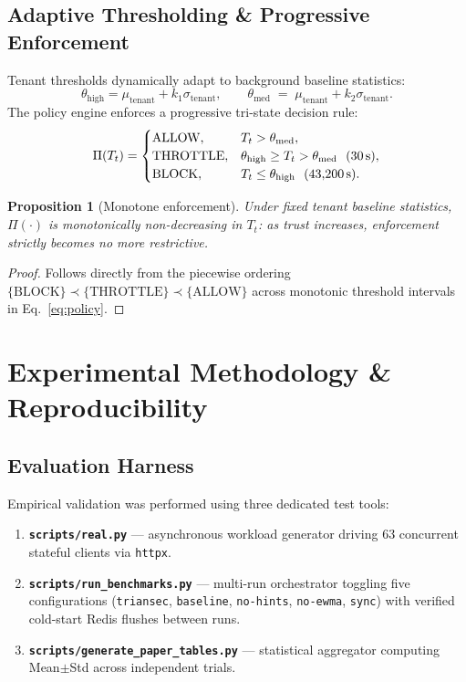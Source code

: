 \documentclass[journal,10pt]{IEEEtran}
\newtheorem{proposition}{Proposition}
\newcommand{\trust}{T_t}
\begin{document}
\subsection{Adaptive Thresholding \& Progressive Enforcement}
Tenant thresholds dynamically adapt to background baseline statistics:
\begin{equation}
\theta_{\mathrm{high}} = \mu_{\mathrm{tenant}} + k_1\sigma_{\mathrm{tenant}},\qquad
\theta_{\mathrm{med}} \;=\; \mu_{\mathrm{tenant}} + k_2\sigma_{\mathrm{tenant}}.
\end{equation}
The policy engine enforces a progressive tri-state decision rule:
\begin{equation}
\Pi(\trust)=
\begin{cases}
\mathrm{ALLOW},     & \trust > \theta_{\mathrm{med}},\\
\mathrm{THROTTLE},  & \theta_{\mathrm{high}} \ge \trust > \theta_{\mathrm{med}}\ \ (\text{30\,s}),\\
\mathrm{BLOCK},     & \trust \le \theta_{\mathrm{high}}\ \ (\text{43{,}200\,s}).
\end{cases}
\label{eq:policy}
\end{equation}

\begin{proposition}[Monotone enforcement]
Under fixed tenant baseline statistics, $\Pi(\cdot)$ is monotonically non-decreasing in $\trust$: as trust increases, enforcement strictly becomes no more restrictive.
\end{proposition}
\begin{proof}
Follows directly from the piecewise ordering $\{\mathrm{BLOCK}\}\prec\{\mathrm{THROTTLE}\}\prec\{\mathrm{ALLOW}\}$ across monotonic threshold intervals in Eq.~\eqref{eq:policy}.
\end{proof}

\section{Experimental Methodology \& Reproducibility}
\label{sec:method}

\subsection{Evaluation Harness}
Empirical validation was performed using three dedicated test tools:
\begin{enumerate}
    \item \textbf{\texttt{scripts/real.py}} --- asynchronous workload generator driving 63 concurrent stateful clients via \texttt{httpx}.
    \item \textbf{\texttt{scripts/run\_benchmarks.py}} --- multi-run orchestrator toggling five configurations (\texttt{triansec}, \texttt{baseline}, \texttt{no-hints}, \texttt{no-ewma}, \texttt{sync}) with verified cold-start Redis flushes between runs.
    \item \textbf{\texttt{scripts/generate\_paper\_tables.py}} --- statistical aggregator computing Mean$\pm$Std across independent trials.
\end{enumerate}
\end{document}

